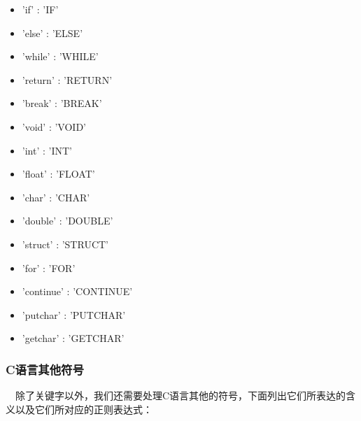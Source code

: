 \documentclass{article}
\begin{document}
\begin{itemize}
\item 'if' : 'IF'
\item 'else' : 'ELSE'
\item 'while' : 'WHILE'
\item 'return' : 'RETURN'
\item 'break' : 'BREAK'
\item 'void'  : 'VOID'
\item  'int'   : 'INT'
\item 'float' : 'FLOAT'
\item 'char'  : 'CHAR'
\item 'double' : 'DOUBLE'
\item 'struct' : 'STRUCT'
\item  'for' : 'FOR'
\item 'continue' : 'CONTINUE'
\item 'putchar' : 'PUTCHAR'
\item 'getchar' : 'GETCHAR'
\end{itemize}

\subsubsection{C语言其他符号}

\quad \ \  除了关键字以外，我们还需要处理C语言其他的符号，下面列出它们所表达的含义以及它们所对应的正则表达式：
\end{document}
